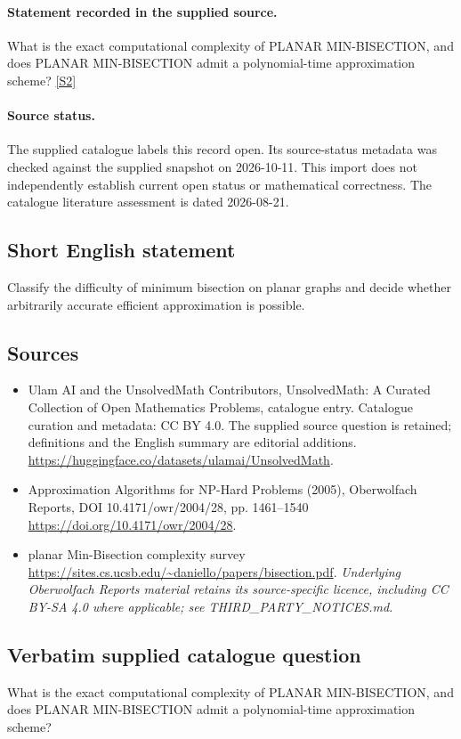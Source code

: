 \documentclass[11pt]{article}
\begin{document}
\paragraph{Statement recorded in the supplied source.}
What is the exact computational complexity of PLANAR MIN-BISECTION, and does PLANAR MIN-BISECTION admit a polynomial-time approximation scheme? \href{https://doi.org/10.4171/owr/2004/28}{[S2]}
\paragraph{Source status.}
The supplied catalogue labels this record open. Its source-status metadata was checked against the supplied snapshot on 2026-10-11. This import does not independently establish current open status or mathematical correctness. The catalogue literature assessment is dated 2026-08-21.
\subsection{Short English statement}
Classify the difficulty of minimum bisection on planar graphs and decide whether arbitrarily accurate efficient approximation is possible.
\subsection{Sources}
\begin{itemize}
\item[S1] Ulam AI and the UnsolvedMath Contributors, UnsolvedMath: A Curated Collection of Open Mathematics Problems, catalogue entry. Catalogue curation and metadata: CC BY 4.0. The supplied source question is retained; definitions and the English summary are editorial additions.
\url{https://huggingface.co/datasets/ulamai/UnsolvedMath}.
\item[S2] Approximation Algorithms for NP-Hard Problems (2005), Oberwolfach Reports, DOI 10.4171/owr/2004/28, pp. 1461--1540
\url{https://doi.org/10.4171/owr/2004/28}.
\item[S3] planar Min-Bisection complexity survey
\url{https://sites.cs.ucsb.edu/~daniello/papers/bisection.pdf}.
\textit{Underlying Oberwolfach Reports material retains its source-specific licence, including CC BY-SA 4.0 where applicable; see THIRD\_PARTY\_NOTICES.md.}
\end{itemize}
\subsection{Verbatim supplied catalogue question}
What is the exact computational complexity of PLANAR MIN-BISECTION, and does PLANAR MIN-BISECTION admit a polynomial-time approximation scheme?
\end{document}
